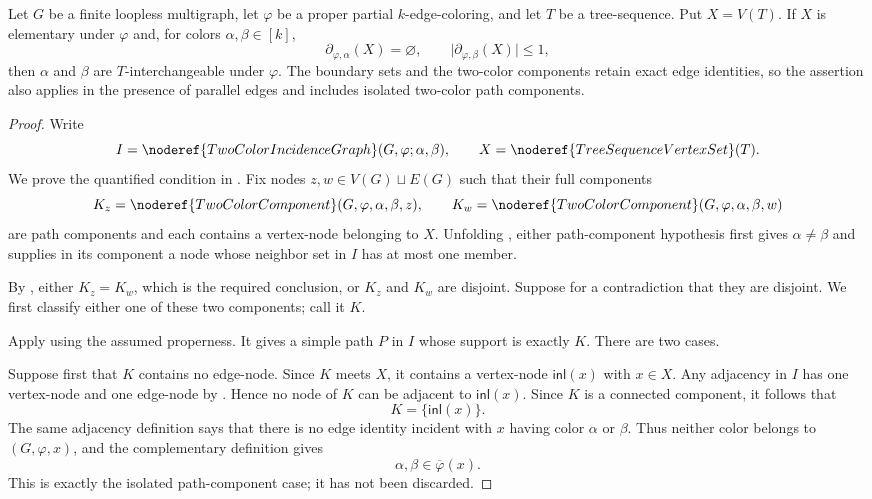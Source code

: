 \begin{lemma}
Let $G$ be a finite loopless multigraph, let $\varphi$ be a proper partial
$k$-edge-coloring, and let $T$ be a tree-sequence.  Put $X=V(T)$.  If $X$
is elementary under $\varphi$ and, for colors $\alpha,\beta\in[k]$,
\[
 \partial_{\varphi,\alpha}(X)=\varnothing,
 \qquad
 \bigl|\partial_{\varphi,\beta}(X)\bigr|\leq 1,
\]
then $\alpha$ and $\beta$ are $T$-interchangeable under $\varphi$.
The boundary sets and the two-color components retain exact edge identities,
so the assertion also applies in the presence of parallel edges and includes
isolated two-color path components.
\end{lemma}
\begin{proof}
Write
\[
 I=\noderef{TwoColorIncidenceGraph}(G,\varphi;\alpha,\beta),
 \qquad X=\noderef{TreeSequenceVertexSet}(T).
\]
We prove the quantified condition in .
Fix nodes $z,w\in V(G)\sqcup E(G)$ such that their full components
\[
 K_z=\noderef{TwoColorComponent}(G,\varphi,\alpha,\beta,z),
 \qquad
 K_w=\noderef{TwoColorComponent}(G,\varphi,\alpha,\beta,w)
\]
are path components and each contains a vertex-node belonging to $X$.
Unfolding , either path-component
hypothesis first gives $\alpha\ne\beta$ and supplies in its component a
node whose neighbor set in $I$ has at most one member.

By , either $K_z=K_w$, which is the
required conclusion, or $K_z$ and $K_w$ are disjoint.  Suppose for a
contradiction that they are disjoint.  We first classify either one of
these two components; call it $K$.

Apply  using the assumed
properness.  It gives a simple path $P$ in $I$ whose support is exactly
$K$.  There are two cases.

Suppose first that $K$ contains no edge-node.  Since $K$ meets $X$, it
contains a vertex-node $\mathsf{inl}(x)$ with $x\in X$.  Any adjacency in
$I$ has one vertex-node and one edge-node by
.  Hence no node of $K$ can be adjacent
to $\mathsf{inl}(x)$.  Since $K$ is a connected component, it follows
that
\[
                         K=\{\mathsf{inl}(x)\}.              \tag{1}
\]
The same adjacency definition says that there is no edge identity
incident with $x$ having color $\alpha$ or $\beta$.  Thus neither color
belongs to $(G,\varphi,x)$, and the complementary
definition  gives
\[
 \alpha,\beta\in\overline\varphi(x).                         \tag{2}
\]
This is exactly the isolated path-component case; it has not been
discarded.


\end{proof}
